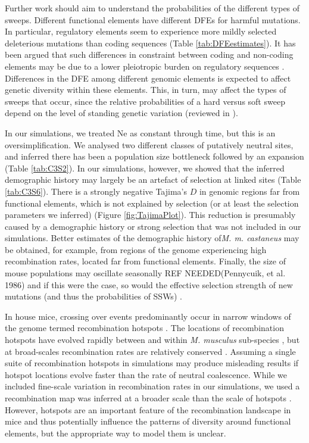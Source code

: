 	Further work should aim to understand the probabilities of the different types of sweeps. Different functional elements have different DFEs for harmful mutations. In particular, regulatory elements seem to experience more mildly selected deleterious mutations than coding sequences \citep{RN122, RN346} (Table \ref{tab:DFEestimates}). It has been argued that such differences in constraint between coding and non-coding elements may be due to a lower pleiotropic burden on regulatory sequences \citep{RN346}. Differences in the DFE among different genomic elements is expected to affect genetic diversity within these elements. This, in turn, may affect the types of sweeps that occur, since the relative probabilities of a hard versus soft sweep depend on the level of standing genetic variation (reviewed in \cite{RN336}). 

	In our simulations, we treated Ne as constant through time, but this is an oversimplification. We analysed two different classes of putatively neutral sites, and inferred there has been a population size bottleneck followed by an expansion (Table \ref{tab:C3S2}). In our simulations, however, we showed that the inferred demographic history may largely be an artefact of selection at linked sites (Table \ref{tab:C3S6}). There is a strongly negative Tajima’s $D$ in genomic regions far from functional elements, which is not explained by selection (or at least the selection parameters we inferred) (Figure \ref{fig:TajimaPlot}). This reduction is presumably caused by a demographic history or strong selection that was not included in our simulations. Better estimates of the demographic history of\textit{M. m. castaneus} may be obtained, for example, from regions of the genome experiencing high recombination rates, located far from functional elements. Finally, the size of mouse populations may oscillate seasonally REF NEEDED(Pennycuik, et al. 1986) and if this were the case, so would the effective selection strength of new mutations (and thus the probabilities of SSWs) \citep{RN350}. 

	In house mice, crossing over events predominantly occur in narrow windows of the genome termed recombination hotspots \cite{RN254}. The locations of recombination hotspots have evolved rapidly between and within \textit{M. musculus} sub-species \citep{RN249}, but at broad-scales recombination rates are relatively conserved \citep{RN340}. Assuming a single suite of recombination hotspots in simulations may produce misleading results if hotspot locations evolve faster than the rate of neutral coalescence. While we included fine-scale variation in recombination rates in our simulations, we used a recombination map was inferred at a broader scale than the scale of hotspots \citep{RN340}. However, hotspots are an important feature of the recombination landscape in mice and thus potentially influence the patterns of diversity around functional elements, but the appropriate way to model them is unclear.

